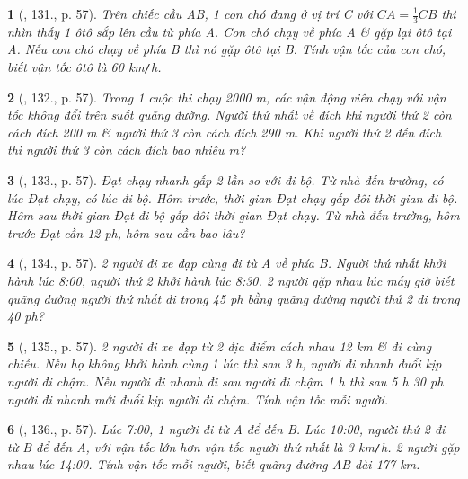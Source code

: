 \documentclass{article}
\newtheorem{baitoan}{}
\begin{document}
\begin{baitoan}[\cite{Binh_Toan_6_tap_2}, 131., p. 57]
	Trên chiếc cầu AB, 1 con chó đang ở vị trí C với $CA = \frac{1}{3}CB$ thì nhìn thấy 1 ôtô sắp lên cầu từ phía A. Con chó chạy về phía A \& gặp lại ôtô tại A. Nếu con chó chạy về phía B thì nó gặp ôtô tại B. Tính vận tốc của con chó, biết vận tốc ôtô là {\rm60 km{\tt/}h}.
\end{baitoan}

\begin{baitoan}[\cite{Binh_Toan_6_tap_2}, 132., p. 57]
	Trong 1 cuộc thi chạy {\rm2000 m}, các vận động viên chạy với vận tốc không đổi trên suốt quãng đường. Người thứ nhất về đích khi người thứ 2 còn cách đích {\rm200 m} \& người thứ 3 còn cách đích {\rm290 m}. Khi người thứ 2 đến đích thì người thứ 3 còn cách đích bao nhiêu {\rm m}?
\end{baitoan}

\begin{baitoan}[\cite{Binh_Toan_6_tap_2}, 133., p. 57]
	Đạt chạy nhanh gấp 2 lần so với đi bộ. Từ nhà đến trường, có lúc Đạt chạy, có lúc đi bộ. Hôm trước, thời gian Đạt chạy gấp đôi thời gian đi bộ. Hôm sau thời gian Đạt đi bộ gấp đôi thời gian Đạt chạy. Từ nhà đến trường, hôm trước Đạt cần {\rm12 ph}, hôm sau cần bao lâu?
\end{baitoan}

\begin{baitoan}[\cite{Binh_Toan_6_tap_2}, 134., p. 57]
	2 người đi xe đạp cùng đi từ A về phía B. Người thứ nhất khởi hành lúc {\rm8:00}, người thứ 2 khởi hành lúc {\rm8:30}. 2 người gặp nhau lúc mấy giờ biết quãng đường người thứ nhất đi trong {\rm45 ph} bằng quãng đường người thứ 2 đi trong {\rm40 ph}?
\end{baitoan}

\begin{baitoan}[\cite{Binh_Toan_6_tap_2}, 135., p. 57]
	2 người đi xe đạp từ 2 địa điểm cách nhau {\rm12 km} \& đi cùng chiều. Nếu họ không khởi hành cùng 1 lúc thì sau {\rm3 h}, người đi nhanh đuổi kịp người đi chậm. Nếu người đi nhanh đi sau người đi chậm {\rm1 h} thì sau {\rm5 h 30 ph} người đi nhanh mới đuổi kịp người đi chậm. Tính vận tốc mỗi người.
\end{baitoan}

\begin{baitoan}[\cite{Binh_Toan_6_tap_2}, 136., p. 57]
	Lúc {\rm7:00}, 1 người đi từ A để đến B. Lúc {\rm10:00}, người thứ 2 đi từ B để đến A, với vận tốc lớn hơn vận tốc người thứ nhất là {\rm3 km{\tt/}h}. 2 người gặp nhau lúc {\rm14:00}. Tính vận tốc mỗi người, biết quãng đường AB dài {\rm177 km}.
\end{baitoan}
\end{document}
